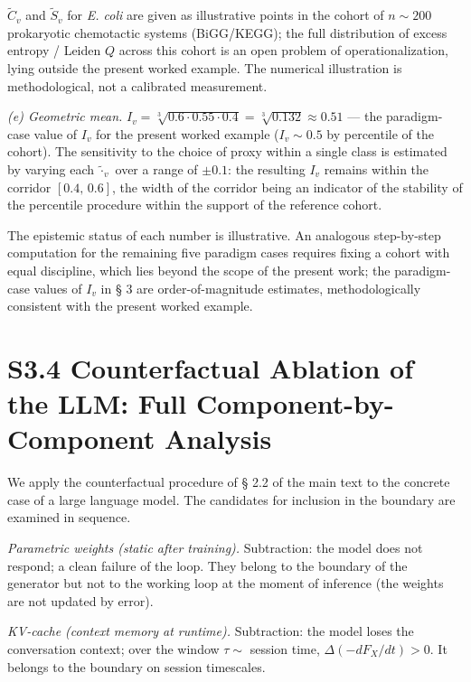 \documentclass[pdflatex,sn-mathphys-ay]{sn-jnl}
\begin{document}
\(\tilde C_v\) and \(\tilde S_v\) for \emph{E. coli} are given as illustrative points in the cohort of \(n \sim 200\) prokaryotic chemotactic systems (BiGG/KEGG); the full distribution of excess entropy / Leiden \(Q\) across this cohort is an open problem of operationalization, lying outside the present worked example. The numerical illustration is methodological, not a calibrated measurement.

\emph{(e) Geometric mean.} \(I_v = \sqrt[3]{0.6 \cdot 0.55 \cdot 0.4} = \sqrt[3]{0.132} \approx 0.51\) --- the paradigm-case value of \(I_v\) for the present worked example (\(I_v \sim 0.5\) by percentile of the cohort). The sensitivity to the choice of proxy within a single class is estimated by varying each \(\tilde{\cdot}_v\) over a range of \(\pm 0.1\): the resulting \(I_v\) remains within the corridor \([0.4,\, 0.6]\), the width of the corridor being an indicator of the stability of the percentile procedure within the support of the reference cohort.

The epistemic status of each number is illustrative. An analogous step-by-step computation for the remaining five paradigm cases requires fixing a cohort with equal discipline, which lies beyond the scope of the present work; the paradigm-case values of \(I_v\) in § 3 are order-of-magnitude estimates, methodologically consistent with the present worked example.

\section*{S3.4 Counterfactual Ablation of the LLM: Full Component-by-Component Analysis}\label{s3.4-counterfactual-ablation-of-the-llm-full-component-by-component-analysis}

We apply the counterfactual procedure of § 2.2 of the main text to the concrete case of a large language model. The candidates for inclusion in the boundary are examined in sequence.

\emph{Parametric weights (static after training).} Subtraction: the model does not respond; a clean failure of the loop. They belong to the boundary of the generator but not to the working loop at the moment of inference (the weights are not updated by error).

\emph{KV-cache (context memory at runtime).} Subtraction: the model loses the conversation context; over the window \(\tau \sim\) session time, \(\Delta(-dF_X/dt) > 0\). It belongs to the boundary on session timescales.
\end{document}

